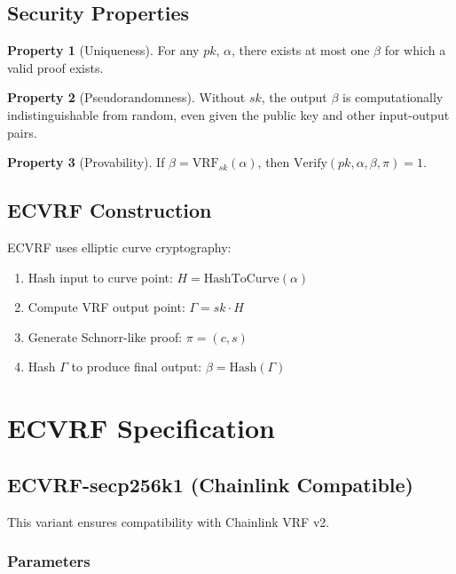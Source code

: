 \documentclass[11pt,a4paper]{article}
\theoremstyle{definition}
\newtheorem{property}{Property}
\begin{document}
\subsection{Security Properties}

\begin{property}[Uniqueness]
For any $pk$, $\alpha$, there exists at most one $\beta$ for which a valid proof exists.
\end{property}

\begin{property}[Pseudorandomness]
Without $sk$, the output $\beta$ is computationally indistinguishable from random, even given the public key and other input-output pairs.
\end{property}

\begin{property}[Provability]
If $\beta = \text{VRF}_{sk}(\alpha)$, then $\text{Verify}(pk, \alpha, \beta, \pi) = 1$.
\end{property}

\subsection{ECVRF Construction}

ECVRF uses elliptic curve cryptography:

\begin{enumerate}
    \item Hash input to curve point: $H = \text{HashToCurve}(\alpha)$
    \item Compute VRF output point: $\Gamma = sk \cdot H$
    \item Generate Schnorr-like proof: $\pi = (c, s)$
    \item Hash $\Gamma$ to produce final output: $\beta = \text{Hash}(\Gamma)$
\end{enumerate}

\section{ECVRF Specification}

\subsection{ECVRF-secp256k1 (Chainlink Compatible)}

This variant ensures compatibility with Chainlink VRF v2.

\subsubsection{Parameters}
\end{document}
